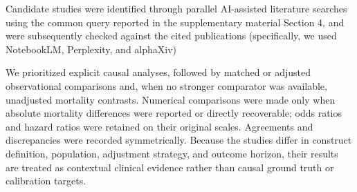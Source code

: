 \documentclass[letterpaper]{article}
\begin{document}
Candidate studies were identified through parallel AI-assisted literature searches using the common query reported in the supplementary material Section 4, and were subsequently checked against the cited publications (specifically, we used NotebookLM, Perplexity, and alphaXiv)




We prioritized explicit causal analyses, followed by
matched or adjusted observational comparisons and, when no stronger comparator
was available, unadjusted mortality contrasts. Numerical comparisons were made
only when absolute mortality differences were reported or directly recoverable;
odds ratios and hazard ratios were retained on their original scales. Agreements
and discrepancies were recorded symmetrically. Because the studies differ in
construct definition, population, adjustment strategy, and outcome horizon,
their results are treated as contextual clinical evidence rather than causal
ground truth or calibration targets.



\end{document}
